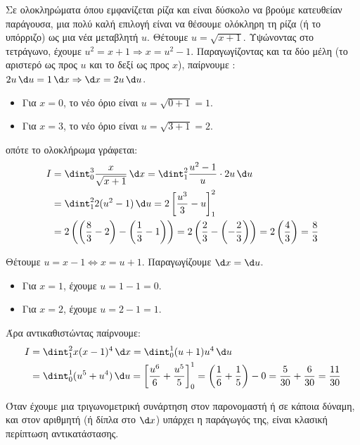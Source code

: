 \lysh
Σε ολοκληρώματα όπου εμφανίζεται ρίζα και είναι δύσκολο να βρούμε κατευθείαν παράγουσα, μια πολύ καλή επιλογή είναι να θέσουμε ολόκληρη τη ρίζα (ή το υπόρριζο) ως μια νέα μεταβλητή $u$. 
Θέτουμε $u = \sqrt{x+1}$.
Υψώνοντας στο τετράγωνο, έχουμε $u^2 = x+1 \Rightarrow x = u^2 - 1$. Παραγωγίζοντας και τα δύο μέλη (το αριστερό ως προς $u$ και το δεξί ως προς $x$), παίρνουμε :
$2u \, \d u = 1 \, \d x \Rightarrow \d x = 2u \, \d u$.
\begin{itemize}
\item Για $x = 0$, το νέο όριο είναι $u = \sqrt{0+1} = 1$.
\item Για $x = 3$, το νέο όριο είναι $u = \sqrt{3+1} = 2$.
\end{itemize}
οπότε το ολοκλήρωμα γράφεται:
\begin{align*}
I &= \dint_0^3 \frac{x}{\sqrt{x+1}} \, \d x = \dint_1^2 \frac{u^2 - 1}{u} \cdot 2u \, \d u \\
&= \dint_1^2 2(u^2 - 1) \, \d u = 2\left[ \frac{u^3}{3} - u \right]_1^2 \\
&= 2\left( \left( \frac{8}{3} - 2 \right) - \left( \frac{1}{3} - 1 \right) \right)= 2\left( \frac{2}{3} - \left( -\frac{2}{3} \right) \right) = 2 \left( \frac{4}{3} \right) = \frac{8}{3}
\end{align*}

\lysh
Θέτουμε $u = x-1\Leftrightarrow x = u+1$. Παραγωγίζουμε $\d x = \d u$.
\begin{itemize}
\item Για $x = 1$, έχουμε $u = 1 - 1 = 0$.
\item Για $x = 2$, έχουμε $u = 2 - 1 = 1$.
\end{itemize}
Άρα αντικαθιστώντας παίρνουμε:
\begin{align*}
I &= \dint_1^2 x(x-1)^4 \, \d x = \dint_0^1 (u+1)u^4 \, \d u \\
&= \dint_0^1 (u^5 + u^4) \, \d u = \left[ \frac{u^6}{6} + \frac{u^5}{5} \right]_0^1 = \left( \frac{1}{6} + \frac{1}{5} \right) - 0 = \frac{5}{30} + \frac{6}{30} = \frac{11}{30}
\end{align*}

\lysh
Όταν έχουμε μια τριγωνομετρική συνάρτηση στον παρονομαστή ή σε κάποια δύναμη, και στον αριθμητή (ή δίπλα στο $\d x$) υπάρχει η παράγωγός της, είναι κλασική περίπτωση αντικατάστασης.


